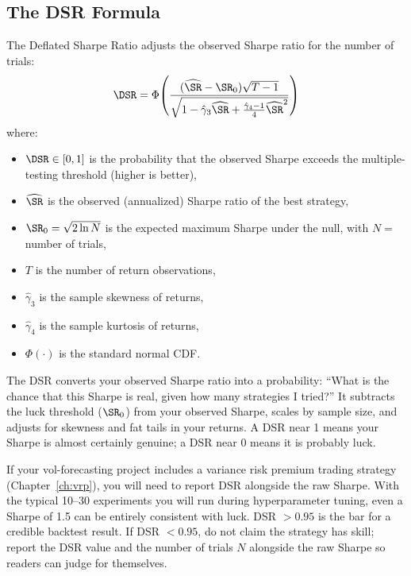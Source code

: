 \subsection{The DSR Formula}

The Deflated Sharpe Ratio adjusts the observed Sharpe ratio for the number of trials:
\begin{equation}
\label{eq:dsr}
\DSR = \Phi\!\left(\frac{(\widehat{\SR} - \SR_0)\sqrt{T-1}}{\sqrt{1 - \hat{\gamma}_3 \widehat{\SR} + \frac{\hat{\gamma}_4 - 1}{4}\widehat{\SR}^2}}\right)
\end{equation}
where:
\begin{itemize}[nosep]
  \item $\DSR \in [0, 1]$ is the probability that the observed Sharpe exceeds the multiple-testing threshold (higher is better),
  \item $\widehat{\SR}$ is the observed (annualized) Sharpe ratio of the best strategy,
  \item $\SR_0 = \sqrt{2 \ln N}$ is the expected maximum Sharpe under the null, with $N =$ number of trials,
  \item $T$ is the number of return observations,
  \item $\hat{\gamma}_3$ is the sample skewness of returns,
  \item $\hat{\gamma}_4$ is the sample kurtosis of returns,
  \item $\Phi(\cdot)$ is the standard normal CDF.
\end{itemize}

\begin{intuition}
The DSR converts your observed Sharpe ratio into a probability: ``What is the chance that this Sharpe is real, given how many strategies I tried?''
It subtracts the luck threshold ($\SR_0$) from your observed Sharpe, scales by sample size, and adjusts for skewness and fat tails in your returns.
A DSR near 1 means your Sharpe is almost certainly genuine; a DSR near 0 means it is probably luck.
\end{intuition}

\begin{projectconnection}
If your vol-forecasting project includes a variance risk premium trading strategy (Chapter~\ref{ch:vrp}), you will need to report DSR alongside the raw Sharpe.
With the typical 10--30 experiments you will run during hyperparameter tuning, even a Sharpe of 1.5 can be entirely consistent with luck.
DSR $> 0.95$ is the bar for a credible backtest result.
If DSR $< 0.95$, do not claim the strategy has skill; report the DSR value and the number of trials $N$ alongside the raw Sharpe so readers can judge for themselves.
\end{projectconnection}

